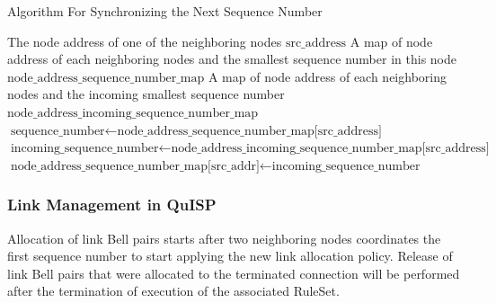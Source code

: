 \begin{algorithm}[H]  
  \begin{minipage}{0.8\linewidth}
  \caption{Algorithm For Synchronizing the Next Sequence Number}                 
  \begin{algorithmic}[1]
    \Require The node address of one of the neighboring nodes $\text{src\_address}$
    \Require A map of node address of each neighboring nodes and the smallest sequence number in this node $\text{node\_address\_sequence\_number\_map}$
    \Require A map of node address of each neighboring nodes and the incoming smallest sequence number $\text{node\_address\_incoming\_sequence\_number\_map}$
    \State $\text{sequence\_number} \gets \text{node\_address\_sequence\_number\_map[src\_address]}$
    \State $\text{incoming\_sequence\_number} \gets \text{node\_address\_incoming\_sequence\_number\_map[src\_address]}$
      \State $\text{node\_address\_sequence\_number\_map[src\_addr]} \gets \text{incoming\_sequence\_number}$
    \EndIf
  \end{algorithmic}
\end{minipage}
\end{algorithm}

\subsubsection{Link Management in QuISP}

Allocation of link Bell pairs starts after two neighboring nodes coordinates the first sequence number to start applying the new link allocation policy.
Release of link Bell pairs that were allocated to the terminated connection will be performed after the termination of execution of the associated RuleSet.


